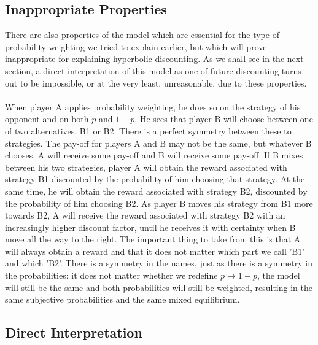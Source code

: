 \documentclass[a4paper,10pt]{article}
\numberwithin{equation}{section}
\begin{document}
\subsection{Inappropriate Properties}
\label{sec:Inappropriate Properties}

There are also properties of the model which are essential for the type of probability weighting we tried to explain earlier, but which will prove inappropriate for explaining hyperbolic discounting. As we shall see in the next section, a direct interpretation of this model as one of future discounting turns out to be impossible, or at the very least, unreasonable, due to these properties.\\
\\
When player A applies probability weighting, he does so on the strategy of his opponent and on both $p$ and $1-p$. He sees that player B will choose between one of two alternatives, B1 or B2. There is a perfect symmetry between these to strategies. The pay-off for players A and B may not be the same, but whatever B chooses, A will receive some pay-off and B will receive some pay-off. If B mixes between his two strategies, player A will obtain the reward associated with strategy B1 discounted by the probability of him choosing that strategy. At the same time, he will obtain the reward associated with strategy B2, discounted by the probability of him choosing B2. As player B moves his strategy from B1 more towards B2, A will receive the reward associated with strategy B2 with an increasingly higher discount factor, until he receives it with certainty when B move all the way to the right. The important thing to take from this is that A will always obtain a reward and that it does not matter which part we call 'B1' and which 'B2'. There is a symmetry in the names, just as there is a symmetry in the probabilities: it does not matter whether we redefine $p \to 1-p$, the model will still be the same and both probabilities will still be weighted, resulting in the same subjective probabilities and the same mixed equilibrium.


\subsection{Direct Interpretation}
\label{sec:Direct Interpretation}
\end{document}
